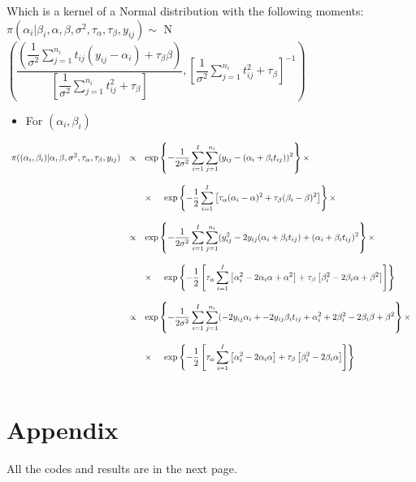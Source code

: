 \documentclass{article}
\begin{document}
Which is a kernel of a Normal distribution with the following moments:\\

$\pi(\alpha_i|\beta_i, \alpha, \beta, \sigma^2, \tau_\alpha, \tau_\beta, y_{ij}) \sim $ N $\left(\dfrac{\left(\dfrac{1}{\sigma^2}\displaystyle\sum_{j=1}^{n_i} t_{ij} (y_{ij} - \alpha_{i}) + \tau_\beta \beta \right)}{\left[ \dfrac{1}{\sigma^2}\displaystyle\sum_{j=1}^{n_i}t_{ij}^2 + \tau_\beta \right]}, \left[ \dfrac{1}{\sigma^2}\displaystyle\sum_{j=1}^{n_i}t_{ij}^2 + \tau_\beta \right]^{-1}\right)$


\begin{itemize}
\item For $(\alpha_i, \beta_i)$
\end{itemize}
\begin{equation*}
\begin{array}{lcl ll }

\pi((\alpha_i,\beta_i)| \alpha, \beta, \sigma^2, \tau_\alpha, \tau_\beta, y_{ij}) & \propto & \mbox{exp}\left\{ - \dfrac{1}{2\sigma^2}\displaystyle\sum_{i=1}^{I}\displaystyle\sum_{j=1}^{n_i}(y_{ij} - (\alpha_i + \beta_i t_{ij}))^2\right\} \times \\ \\

& & \times \hspace{0.5cm} \mbox{exp}\left\{ - \dfrac{1}{2} 
\displaystyle\sum_{i=1}^{I} \left[ \tau_{\alpha}(\alpha_{i} - \alpha)^2 + \tau_{\beta}(\beta_{i} - \beta)^2 \right]\right\} \times \\ \\

& \propto & \mbox{exp}\left\{ - \dfrac{1}{2\sigma^2}\displaystyle\sum_{i=1}^{I}\displaystyle\sum_{j=1}^{n_i}(y_{ij}^2 -2y_{ij}(\alpha_i + \beta_i t_{ij}) + (\alpha_i + \beta_i t_{ij})^2\right\} \times \\ \\

& & \times \hspace{0.5cm} \mbox{exp}\left\{ - \dfrac{1}{2} \left[\tau_{\alpha}
\displaystyle\sum_{i=1}^{I} \left[\alpha_{i}^2 -2\alpha_{i}\alpha + \alpha^2 \right] + \tau_{\beta}\left[\beta_{i}^2 -2\beta_{i}\alpha + \beta^2 \right]\right]\right\} \\ \\

& \propto & \mbox{exp}\left\{ - \dfrac{1}{2\sigma^2}\displaystyle\sum_{i=1}^{I}\displaystyle\sum_{j=1}^{n_i}( -2y_{ij}\alpha_i + -2y_{ij}\beta_i t_{ij} + \alpha_i^2 + 2\beta_i^2 -2\beta_i\beta + \beta^2\right\} \times \\ \\

& & \times \hspace{0.5cm} \mbox{exp}\left\{ - \dfrac{1}{2}\left[ \tau_{\alpha}
\displaystyle\sum_{i=1}^{I} \left[\alpha_{i}^2 -2\alpha_{i}\alpha \right] + \tau_{\beta}\left[\beta_{i}^2 -2\beta_{i}\alpha \right]\right]\right\} \\ \\

 \end{array}
\end{equation*}

\section{Appendix}

All the codes and results are in the next page.
\end{document}
